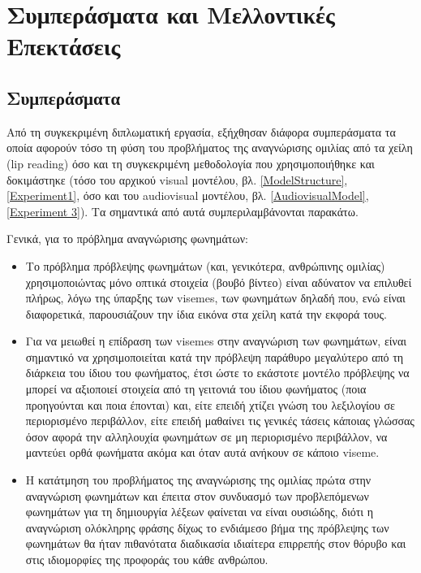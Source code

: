 \section{Συμπεράσματα και Μελλοντικές Επεκτάσεις}
\label{ConclusionsFuture}
\subsection{Συμπεράσματα}
\label{Conclusions}
Από τη συγκεκριμένη διπλωματική εργασία, εξήχθησαν διάφορα συμπεράσματα τα οποία αφορούν τόσο τη φύση του προβλήματος της αναγνώρισης ομιλίας από τα χείλη (lip reading) όσο και τη συγκεκριμένη μεθοδολογία που χρησιμοποιήθηκε και δοκιμάστηκε (τόσο του αρχικού visual μοντέλου, βλ. \ref{ModelStructure}, \ref{Experiment1},  όσο και του audiovisual μοντέλου, βλ. \ref{AudiovisualModel}, \ref{Experiment 3}). Τα σημαντικά από αυτά συμπεριλαμβάνονται παρακάτω.

Γενικά, για το πρόβλημα αναγνώρισης φωνημάτων:

\begin{itemize}
\item Το πρόβλημα πρόβλεψης φωνημάτων (και, γενικότερα, ανθρώπινης ομιλίας) χρησιμοποιώντας μόνο οπτικά στοιχεία (βουβό βίντεο) είναι αδύνατον να επιλυθεί πλήρως, λόγω της ύπαρξης των visemes, των φωνημάτων δηλαδή που, ενώ είναι διαφορετικά, παρουσιάζουν την ίδια εικόνα στα χείλη κατά την εκφορά τους.

\item Για να μειωθεί η επίδραση των visemes στην αναγνώριση των φωνημάτων, είναι σημαντικό να χρησιμοποιείται κατά την πρόβλεψη παράθυρο μεγαλύτερο από τη διάρκεια του ίδιου του φωνήματος, έτσι ώστε το εκάστοτε μοντέλο πρόβλεψης να μπορεί να αξιοποιεί στοιχεία από τη γειτονιά του ίδιου φωνήματος (ποια προηγούνται και ποια έπονται) και, είτε επειδή χτίζει γνώση του λεξιλογίου σε περιορισμένο περιβάλλον, είτε επειδή μαθαίνει τις γενικές τάσεις κάποιας γλώσσας όσον αφορά την αλληλουχία φωνημάτων σε μη περιορισμένο περιβάλλον, να μαντεύει ορθά φωνήματα ακόμα και όταν αυτά ανήκουν σε κάποιο viseme.

\item Η κατάτμηση του προβλήματος της αναγνώρισης της ομιλίας πρώτα στην αναγνώριση φωνημάτων και έπειτα στον συνδυασμό των προβλεπόμενων φωνημάτων για τη δημιουργία λέξεων φαίνεται να είναι ουσιώδης, διότι η αναγνώριση ολόκληρης φράσης δίχως το ενδιάμεσο βήμα της πρόβλεψης των φωνημάτων θα ήταν πιθανότατα διαδικασία ιδιαίτερα επιρρεπής στον θόρυβο και στις ιδιομορφίες της προφοράς του κάθε ανθρώπου.
\end{itemize}

